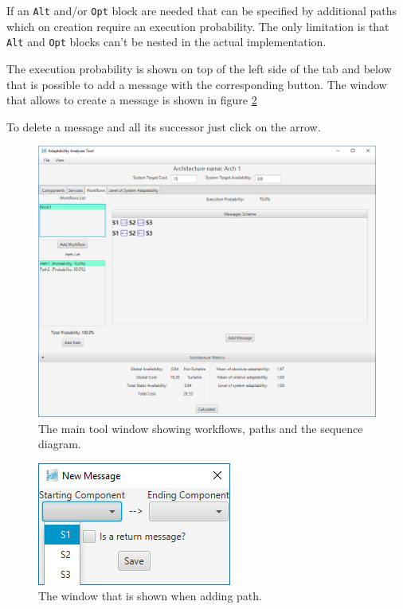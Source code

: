 If an \texttt{Alt} and/or \texttt{Opt} block are needed that can be specified by additional paths which on creation require an execution probability. The only limitation is that \texttt{Alt} and \texttt{Opt} blocks can't be nested in the actual implementation.

The execution probability is shown on top of the left side of the tab and below that is possible to add a message with the corresponding button. The window that allows to create a message is shown in figure \ref{fig:message}

To delete a message and all its successor just click on the arrow.

\begin{figure}[!ht]
	\centerline
	{\includegraphics[scale=0.50]{img/work1path1.png}}
	\caption[Workflows Tab]{The main tool window showing workflows, paths and the sequence diagram.}
	\label{fig:workflow-path1}
\end{figure}

\begin{figure}[!ht]
	\centerline
	{\includegraphics[scale=0.6]{img/message.png}}
	\caption[Add Path Window]{The window that is shown when adding path.}
	\label{fig:message}
\end{figure}

